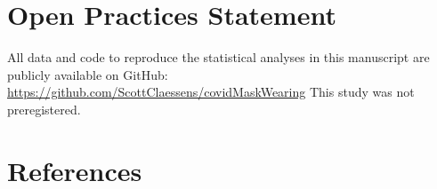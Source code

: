 \documentclass[
  man, donotrepeattitle,mask,floatsintext]{apa6}
\begin{document}
\hypertarget{open-practices-statement}{%
\section{Open Practices Statement}\label{open-practices-statement}}

All data and code to reproduce the statistical analyses in this manuscript are publicly available on GitHub: \url{https://github.com/ScottClaessens/covidMaskWearing} This study was not preregistered.

\newpage

\hypertarget{references}{%
\section{References}\label{references}}

\begingroup
\end{document}
